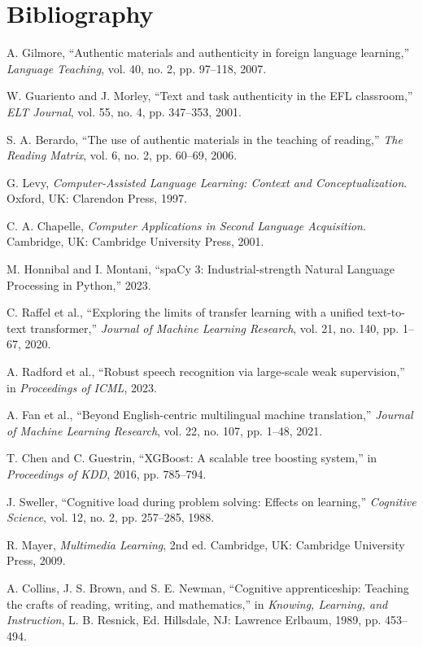 \documentclass[12pt,a4paper,oneside]{report}
\begin{document}
\chapter*{Bibliography}
\begin{enumerate}[label={[\arabic*]}]
  \item A. Gilmore, ``Authentic materials and authenticity in foreign language learning,'' \emph{Language Teaching}, vol. 40, no. 2, pp. 97--118, 2007.
  \item W. Guariento and J. Morley, ``Text and task authenticity in the EFL classroom,'' \emph{ELT Journal}, vol. 55, no. 4, pp. 347--353, 2001.
  \item S. A. Berardo, ``The use of authentic materials in the teaching of reading,'' \emph{The Reading Matrix}, vol. 6, no. 2, pp. 60--69, 2006.
  \item G. Levy, \emph{Computer-Assisted Language Learning: Context and Conceptualization}. Oxford, UK: Clarendon Press, 1997.
  \item C. A. Chapelle, \emph{Computer Applications in Second Language Acquisition}. Cambridge, UK: Cambridge University Press, 2001.
  \item M. Honnibal and I. Montani, ``spaCy 3: Industrial-strength Natural Language Processing in Python,'' 2023.
  \item C. Raffel et al., ``Exploring the limits of transfer learning with a unified text-to-text transformer,'' \emph{Journal of Machine Learning Research}, vol. 21, no. 140, pp. 1--67, 2020.
  \item A. Radford et al., ``Robust speech recognition via large-scale weak supervision,'' in \emph{Proceedings of ICML}, 2023.
  \item A. Fan et al., ``Beyond English-centric multilingual machine translation,'' \emph{Journal of Machine Learning Research}, vol. 22, no. 107, pp. 1--48, 2021.
  \item T. Chen and C. Guestrin, ``XGBoost: A scalable tree boosting system,'' in \emph{Proceedings of KDD}, 2016, pp. 785--794.
  \item J. Sweller, ``Cognitive load during problem solving: Effects on learning,'' \emph{Cognitive Science}, vol. 12, no. 2, pp. 257--285, 1988.
  \item R. Mayer, \emph{Multimedia Learning}, 2nd ed. Cambridge, UK: Cambridge University Press, 2009.
  \item A. Collins, J. S. Brown, and S. E. Newman, ``Cognitive apprenticeship: Teaching the crafts of reading, writing, and mathematics,'' in \emph{Knowing, Learning, and Instruction}, L. B. Resnick, Ed. Hillsdale, NJ: Lawrence Erlbaum, 1989, pp. 453--494.

\end{enumerate}
\end{document}
